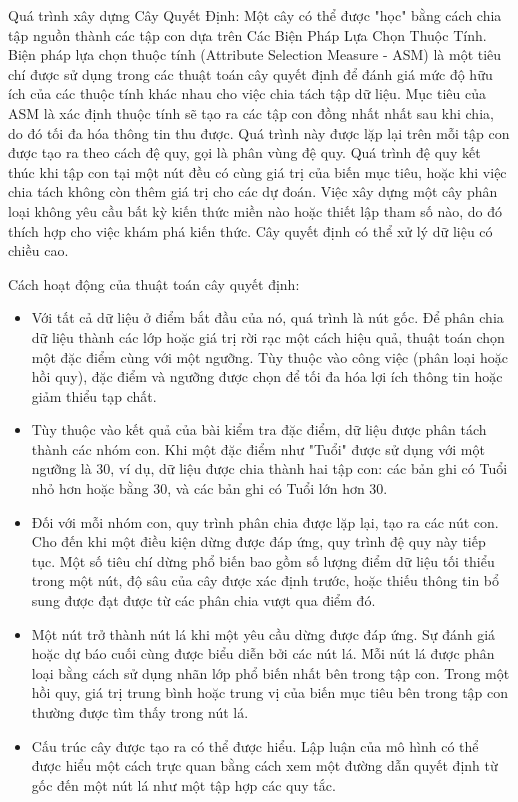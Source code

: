 \documentclass[a4paper]{article}
\begin{document}
Quá trình xây dựng Cây Quyết Định: Một cây có thể được "học" bằng cách chia tập nguồn thành các tập con dựa trên Các Biện Pháp Lựa Chọn Thuộc Tính. Biện pháp lựa chọn thuộc tính (Attribute Selection Measure - ASM) là một tiêu chí được sử dụng trong các thuật toán cây quyết định để đánh giá mức độ hữu ích của các thuộc tính khác nhau cho việc chia tách tập dữ liệu. Mục tiêu của ASM là xác định thuộc tính sẽ tạo ra các tập con đồng nhất nhất sau khi chia, do đó tối đa hóa thông tin thu được. Quá trình này được lặp lại trên mỗi tập con được tạo ra theo cách đệ quy, gọi là phân vùng đệ quy. Quá trình đệ quy kết thúc khi tập con tại một nút đều có cùng giá trị của biến mục tiêu, hoặc khi việc chia tách không còn thêm giá trị cho các dự đoán. Việc xây dựng một cây phân loại không yêu cầu bất kỳ kiến thức miền nào hoặc thiết lập tham số nào, do đó thích hợp cho việc khám phá kiến thức. Cây quyết định có thể xử lý dữ liệu có chiều cao.

Cách hoạt động của thuật toán cây quyết định:
\begin{itemize}
    \item Với tất cả dữ liệu ở điểm bắt đầu của nó, quá trình là nút gốc. Để phân chia dữ liệu thành các lớp hoặc giá trị rời rạc một cách hiệu quả, thuật toán chọn một đặc điểm cùng với một ngưỡng. Tùy thuộc vào công việc (phân loại hoặc hồi quy), đặc điểm và ngưỡng được chọn để tối đa hóa lợi ích thông tin hoặc giảm thiểu tạp chất.
    \item Tùy thuộc vào kết quả của bài kiểm tra đặc điểm, dữ liệu được phân tách thành các nhóm con. Khi một đặc điểm như "Tuổi" được sử dụng với một ngưỡng là 30, ví dụ, dữ liệu được chia thành hai tập con: các bản ghi có Tuổi nhỏ hơn hoặc bằng 30, và các bản ghi có Tuổi lớn hơn 30.
    \item Đối với mỗi nhóm con, quy trình phân chia được lặp lại, tạo ra các nút con. Cho đến khi một điều kiện dừng được đáp ứng, quy trình đệ quy này tiếp tục. Một số tiêu chí dừng phổ biến bao gồm số lượng điểm dữ liệu tối thiểu trong một nút, độ sâu của cây được xác định trước, hoặc thiếu thông tin bổ sung được đạt được từ các phân chia vượt qua điểm đó.
    \item Một nút trở thành nút lá khi một yêu cầu dừng được đáp ứng. Sự đánh giá hoặc dự báo cuối cùng được biểu diễn bởi các nút lá. Mỗi nút lá được phân loại bằng cách sử dụng nhãn lớp phổ biến nhất bên trong tập con. Trong một hồi quy, giá trị trung bình hoặc trung vị của biến mục tiêu bên trong tập con thường được tìm thấy trong nút lá.
    \item Cấu trúc cây được tạo ra có thể được hiểu. Lập luận của mô hình có thể được hiểu một cách trực quan bằng cách xem một đường dẫn quyết định từ gốc đến một nút lá như một tập hợp các quy tắc.
\end{itemize}
\end{document}
